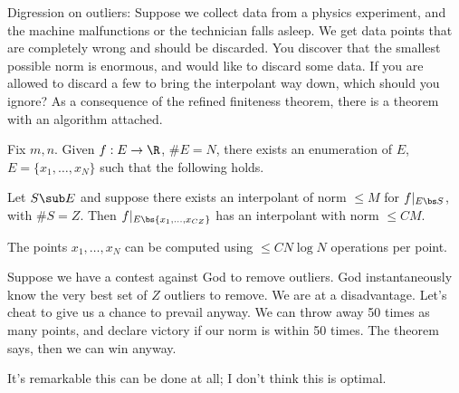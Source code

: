 Digression on outliers: 
Suppose we collect data from a physics experiment, and the machine malfunctions or the technician falls asleep. We get data points that are completely wrong and should be discarded.
You discover that the smallest possible norm is enormous, and would like to discard some data. If you are allowed to discard a few to bring the interpolant way down, which should you ignore? As a consequence of the refined finiteness theorem, there is a theorem with an algorithm attached.
\begin{thm}
Fix $m,n$. Given $f:E\to \R$, $\#E=N$, there exists an enumeration of $E$, $E=\{x_1,\ldots, x_N\}$ such that the following holds.

Let $S\sub E$ and suppose there exists an interpolant of norm $\le M$ for $f|_{E\bs S}$, with $\#S=Z$.
Then $f|_{E\bs \{x_1,\ldots, x_{CZ}\}}$ has an interpolant with norm $\le CM$. 

The points $x_1,\ldots, x_N$ can be computed using $\le CN\log N$ operations per point.
\end{thm}
Suppose we have a contest against God to remove outliers. God instantaneously know the very best set of $Z$ outliers to remove. We are at a disadvantage. Let's cheat to give us a chance to prevail anyway. We can throw away 50 times as many points, and declare victory if our norm is within 50 times. The theorem says, then we can win anyway.

It's remarkable this can be done at all; I don't think this is optimal. 

